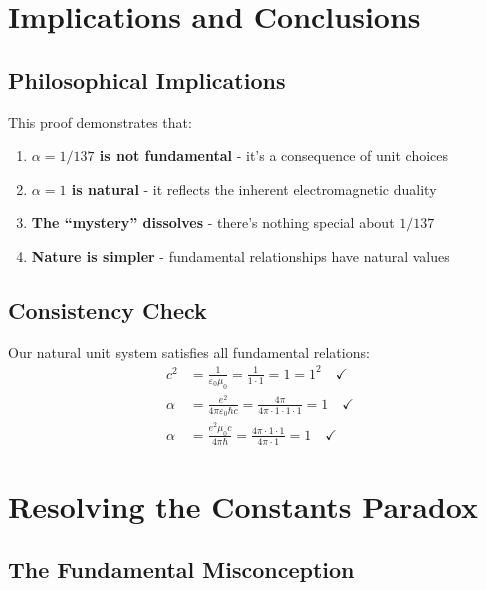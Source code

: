 \documentclass[12pt,a4paper]{article}
\newcommand{\alphaem}{\alpha}
\begin{document}
	\section{Implications and Conclusions}
	
	\subsection{Philosophical Implications}
	
	This proof demonstrates that:
	
	\begin{enumerate}
		\item \textbf{$\alpha = 1/137$ is not fundamental} - it's a consequence of unit choices
		\item \textbf{$\alpha = 1$ is natural} - it reflects the inherent electromagnetic duality
		\item \textbf{The ``mystery'' dissolves} - there's nothing special about $1/137$
		\item \textbf{Nature is simpler} - fundamental relationships have natural values
	\end{enumerate}
	
	\subsection{Consistency Check}
	
	\begin{tcolorbox}[colback=blue!5!white,colframe=blue!75!black,title=Internal Consistency Verification]
		Our natural unit system satisfies all fundamental relations:
		\begin{align}
			c^2 &= \frac{1}{\varepsilon_0\mu_0} = \frac{1}{1 \cdot 1} = 1 = 1^2 \quad \checkmark\\
			\alphaem &= \frac{e^2}{4\pi\varepsilon_0\hbar c} = \frac{4\pi}{4\pi \cdot 1 \cdot 1 \cdot 1} = 1 \quad \checkmark\\
			\alphaem &= \frac{e^2\mu_0 c}{4\pi\hbar} = \frac{4\pi \cdot 1 \cdot 1}{4\pi \cdot 1} = 1 \quad \checkmark
		\end{align}
	\end{tcolorbox}
	
\section{Resolving the Constants Paradox}

\subsection{The Fundamental Misconception}
\end{document}
